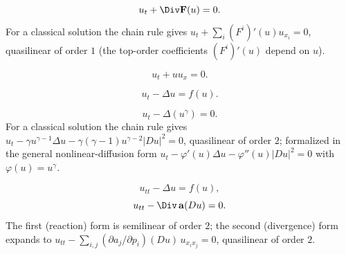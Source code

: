 \begin{example}
\label{ex:scalar-conservation-law}
\leanok
$$u_t + \Div\mathbf{F}(u) = 0.$$
For a classical solution the chain rule gives $u_t + \sum_i (F^i)'(u) u_{x_i} = 0$, quasilinear of order $1$ (the top-order coefficients $(F^i)'(u)$ depend on $u$).
\end{example}

\begin{example}
\label{ex:inviscid-burgers-equation}
\leanok
$$u_t + uu_x = 0.$$
\end{example}

\begin{example}
\label{ex:scalar-reaction-diffusion-equation}
\leanok
$$u_t - \Delta u = f(u).$$
\end{example}

\begin{example}
\label{ex:porous-medium-equation}
\leanok
$$u_t - \Delta(u^\gamma) = 0.$$
For a classical solution the chain rule gives $u_t - \gamma u^{\gamma-1}\Delta u - \gamma(\gamma-1)u^{\gamma-2}|Du|^2 = 0$, quasilinear of order $2$; formalized in the general nonlinear-diffusion form $u_t - \varphi'(u)\Delta u - \varphi''(u)|Du|^2 = 0$ with $\varphi(u) = u^\gamma$.
\end{example}

\begin{example}
\label{ex:nonlinear-wave-equations}
\leanok
$$u_{tt} - \Delta u = f(u),$$
$$u_{tt} - \Div\,\mathbf{a}(Du) = 0.$$
The first (reaction) form is semilinear of order $2$; the second (divergence) form expands to $u_{tt} - \sum_{i,j}(\partial a_j/\partial p_i)(Du)\,u_{x_ix_j} = 0$, quasilinear of order $2$.
\end{example}

